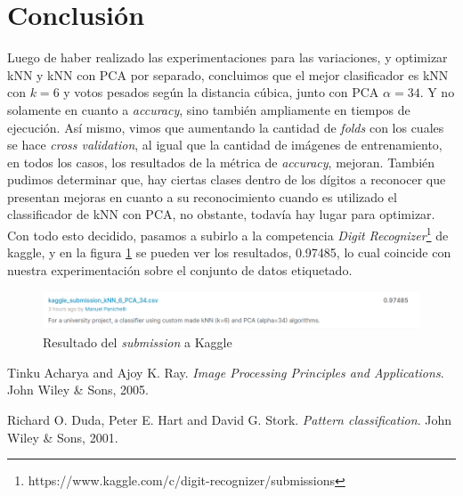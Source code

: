 \documentclass[a4paper]{article}
\begin{document}
\section{Conclusión}

Luego de haber realizado las experimentaciones para las variaciones, y optimizar kNN y kNN con PCA por separado, concluimos que el mejor clasificador es kNN con $k=6$ y votos pesados según la distancia cúbica, junto con PCA $\alpha=34$. Y no solamente en cuanto a \emph{accuracy}, sino también ampliamente en tiempos de ejecución. Así mismo, vimos que aumentando la cantidad de \emph{folds} con los cuales se hace \emph{cross validation}, al igual que la cantidad de imágenes de entrenamiento, en todos los casos, los resultados de la métrica de \emph{accuracy}, mejoran. También pudimos determinar que, hay ciertas clases dentro de los dígitos a reconocer que presentan mejoras en cuanto a su reconocimiento cuando es utilizado el classificador de kNN con PCA, no obstante, todavía hay lugar para optimizar. Con todo esto decidido, pasamos a subirlo a la competencia \textit{Digit Recognizer}\footnote{https://www.kaggle.com/c/digit-recognizer/submissions} de kaggle, y en la figura \ref{fig:kaggle} se pueden ver los resultados, 0.97485, lo cual coincide con nuestra experimentación sobre el conjunto de datos etiquetado.

\begin{figure}[H]
    \centering
    \includegraphics[scale=0.5]{img/kaggle.png}
    \caption{Resultado del \textit{submission} a Kaggle}
    \label{fig:kaggle}
\end{figure}


\begin{thebibliography}{9}

Tinku Acharya and Ajoy K. Ray. 
\textit{Image Processing Principles and Applications}. 
John Wiley & Sons, 2005.

Richard O. Duda, Peter E. Hart and David G. Stork.
\textit{Pattern classification}.
John Wiley & Sons, 2001.

\end{thebibliography}
\end{document}
